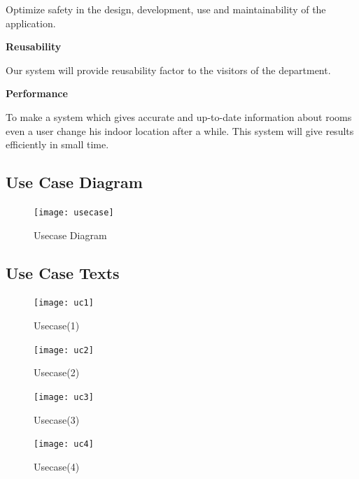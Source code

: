Optimize safety in the design, development, use and maintainability of the application.

\textbf{Reusability}

Our system will provide reusability factor to the visitors of the department.

\textbf{Performance}

To make a system which gives accurate and up-to-date information about rooms even a user change his indoor location after a while. This system will give results efficiently in small time.


\subsection{Use Case Diagram}
\begin{figure}[h]
\begin{center}
\texttt{[image: usecase]}
\caption{Usecase Diagram}
\label{fig:10}
\end{center}
\end{figure}
\clearpage
\subsection{Use Case Texts}

\begin{figure}[h]
\begin{center}
\texttt{[image: uc1]}
\caption{Usecase(1)}
\label{fig:11}
\end{center}
\end{figure}


\begin{figure}[h]
\begin{center}
\texttt{[image: uc2]}
\caption{Usecase(2)}
\label{fig:12}
\end{center}
\end{figure}

\begin{figure}[h]
\begin{center}
\texttt{[image: uc3]}
\caption{Usecase(3)}
\label{fig:13}
\end{center}

\end{figure}

\begin{figure}[h]
\begin{center}
\texttt{[image: uc4]}
\caption{Usecase(4)}
\label{fig:14}
\end{center}
\end{figure}

